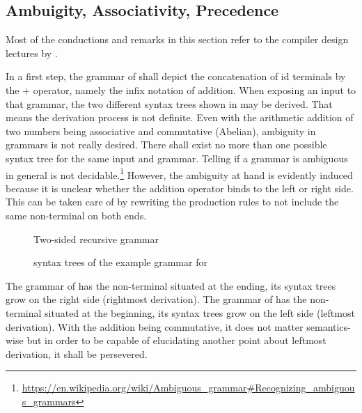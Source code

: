 \subsection{Ambuigity, Associativity, Precedence}\FloatBarrier

Most of the conductions and remarks in this section refer to the compiler design lectures by \cite{gate_compiler_design}.

In a first step, the grammar of  shall depict the concatenation of id terminals by the + operator, namely the infix notation of addition. When exposing an input  to that grammar, the two different syntax trees shown in  may be derived. That means the derivation process is not definite. Even with the arithmetic addition of two numbers being associative and commutative (Abelian), ambiguity in grammars is not really desired. There shall exist no more than one possible syntax tree for the same input and grammar. Telling if a grammar is ambiguous in general is not decidable.\footnote{\url{https://en.wikipedia.org/wiki/Ambiguous_grammar\#Recognizing_ambiguous_grammars}} However, the ambiguity at hand is evidently induced because it is unclear whether the addition operator binds to the left or right side. This can be taken care of by rewriting the production rules to not include the same non-terminal on both ends.

\begin{figure}
	\centering
	
	
	
	\caption{Two-sided recursive grammar}
	\label{fig:grammar_example_amb}
\end{figure}

\begin{figure}
	\begin{center}
		
	\end{center}

	\caption{syntax trees of the example grammar for }
	\label{fig:tree_amb}
\end{figure}

\FloatBarrier

The grammar of  has the non-terminal situated at the ending, its syntax trees grow on the right side (rightmost derivation). The grammar of  has the non-terminal situated at the beginning, its syntax trees grow on the left side (leftmost derivation). With the addition being commutative, it does not matter semantics-wise but in order to be capable of elucidating another point about leftmost derivation, it shall be persevered.

